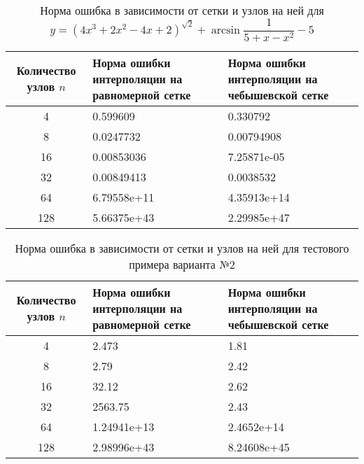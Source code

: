 \documentclass{article}
\begin{document}
    \begin{table}[H]
        \centering
        \caption{Норма ошибка в зависимости от сетки и узлов на ней для $y = (4x^3 + 2x^2 - 4x + 2 )^{\sqrt{2}} + \arcsin{\dfrac{1}{5+x - x^2}} - 5$}
        \begin{tabular}{|c|p{5cm}|p{5cm}|}
            \hline
            Количество узлов $n$ & Норма ошибки интерполяции
            на равномерной сетке & Норма ошибки интерполяции
            на чебышевской сетке \\
            \hline 
            4 &  0.599609 &  0.330792 \\ \hline
            8 &  0.0247732 & 0.00794908\\ \hline
            16 &0.00853036 & 7.25871e-05\\ \hline
            32 & 0.00849413 & 0.0038532\\ \hline
            64 & 6.79558e+11 & 4.35913e+14\\ \hline
            128 & 5.66375e+43&  2.29985e+47\\ \hline
        \end{tabular}
    \end{table}
    \begin{table}[H]
        \centering
        \caption{Норма ошибка в зависимости от сетки и узлов на ней для тестового примера варианта №2}
        \begin{tabular}{|c|p{5cm}|p{5cm}|}
            \hline
            Количество узлов $n$ & Норма ошибки интерполяции
            на равномерной сетке & Норма ошибки интерполяции
            на чебышевской сетке \\
            \hline 
            4 & 2.473 &  1.81 \\ \hline
            8 & 2.79 & 2.42\\ \hline
            16 &32.12 & 2.62\\ \hline
            32 & 2563.75 & 2.43\\ \hline
            64 &1.24941e+13 & 2.4652e+14\\ \hline
            128 & 2.98996e+43&  8.24608e+45\\ \hline
        \end{tabular}
    \end{table}
\end{document}
